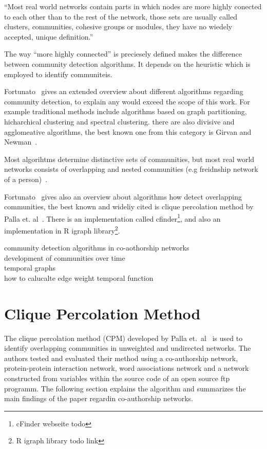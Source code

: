 \documentclass[runningheads,a4paper]{llncs}
\begin{document}
``Most real world networks contain parts in which nodes are more highly conected to each other than to the rest of the network, those sets are usually called clusters, communities, cohesive groups or modules, they have no wiedely accepted, unique definition.''~\cite{palla2005uncovering}

The way ``more highly connected'' is preciesely defined makes the difference between community detection algorithms. It depends on the heuristic which is employed to identify communiteis.~\cite{porter2009communities}

Fortunato~\cite{fortunato2010community} gives an extended overview about different algorithms regarding community detection, to explain any would exceed the scope of this work. For example traditional methods include algorithms based on graph partitioning, hicharchical clustering and spectral clustering. there are also divisive and agglomeative algorithms, the best known one from this category is Girvan and Newman~\cite{girvan2002community}.

Most algorihtms determine distinctive sets of communities, but most real world networks  consists of overlapping and nested communities (e.g freidnship network of a person)~\cite{palla2005uncovering}.

Fortunato~\cite{fortunato2010community} gives also an overview about algorithms how detect overlapping communities, the best known and wideliy cited is clique percolation method by Palla et. al~\cite{palla2005uncovering}. There is an implementation called cfinder\footnote{cFinder webseite todo}, and also an implementation in R igraph library\footnote{R igraph library todo link}.


community detection algorithms in co-aothorship networks\\

development of communities over time\\

temporal graphs\\

how to calucalte edge weight temporal function\\

\section{Clique Percolation Method}
\label{cpm}
The clique percolation method (CPM) developed by Palla et.~al~\cite{palla2007quantifying} is used to identify overlapping communities in unweighted and undirected networks.
The authors tested and evaluated their method using a co-authorship network, protein-protein interaction network, word associations network and a network constructed from variables within the source code of an open source ftp programm.
The following section explains the algorithm and summarizes the main findings of the paper regardin co-authorship networks.
\end{document}
